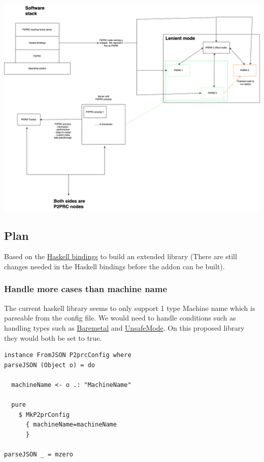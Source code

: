 \documentclass[11pt]{article}
\begin{document}
\begin{center}
\includegraphics[width=.9\linewidth]{./P2PRC-Tracking-home-server.png}
\end{center}

\subsection{Plan}
\label{sec:org7e9ebcb}
Based on the \href{https://github.com/Akilan1999/p2p-rendering-computation/tree/master/haskell}{Haskell bindings} to build an extended library (There are still changes needed
in the Haskell bindings before the addon can be built). 

\subsubsection{Handle more cases than machine name}
\label{sec:org0007684}
The current haskell library seems to only support 1 type Machine name which is parseable from
the config file. We would need to handle conditions such as handling types such as \href{https://github.com/Akilan1999/p2p-rendering-computation/blob/67165d4bf63d82794a1a264edf843295b727c226/config/config.go\#L39}{Baremetal} and \href{https://github.com/Akilan1999/p2p-rendering-computation/blob/67165d4bf63d82794a1a264edf843295b727c226/config/config.go\#L40}{UnsafeMode}.
On this proposed library they would both be set to true. 
\begin{verbatim}
instance FromJSON P2prcConfig where
parseJSON (Object o) = do

  machineName <- o .: "MachineName"

  pure
    $ MkP2prConfig
      { machineName=machineName
      }

parseJSON _ = mzero
\end{verbatim}
\end{document}
